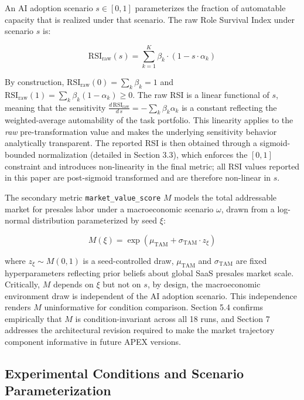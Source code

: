 \documentclass[10pt, conference]{IEEEtran}
\begin{document}
An AI adoption scenario $s \in [0,1]$ parameterizes the fraction of automatable capacity that is realized under that scenario. The raw Role Survival Index under scenario $s$ is:

\begin{equation}
\text{RSI}_{\text{raw}}(s) = \sum_{k=1}^{K} \beta_k \cdot \left(1 - s \cdot \alpha_k\right)
\end{equation}

By construction, $\text{RSI}_{\text{raw}}(0) = \sum_k \beta_k = 1$ and $\text{RSI}_{\text{raw}}(1) = \sum_k \beta_k (1 - \alpha_k) \geq 0$. The raw RSI is a linear functional of $s$, meaning that the sensitivity $\frac{d\,\text{RSI}_{\text{raw}}}{d\,s} = -\sum_k \beta_k \alpha_k$ is a constant reflecting the weighted-average automability of the task portfolio. This linearity applies to the \textit{raw} pre-transformation value and makes the underlying sensitivity behavior analytically transparent. The reported RSI is then obtained through a sigmoid-bounded normalization (detailed in Section 3.3), which enforces the $[0,1]$ constraint and introduces non-linearity in the final metric; all RSI values reported in this paper are post-sigmoid transformed and are therefore non-linear in $s$.

The secondary metric \texttt{market\_value\_score} $M$ models the total addressable market for presales labor under a macroeconomic scenario $\omega$, drawn from a log-normal distribution parameterized by seed $\xi$:

\begin{equation}
M(\xi) = \exp\left(\mu_{\text{TAM}} + \sigma_{\text{TAM}} \cdot z_\xi\right)
\end{equation}

where $z_\xi \sim M(0,1)$ is a seed-controlled draw, $\mu_{\text{TAM}}$ and $\sigma_{\text{TAM}}$ are fixed hyperparameters reflecting prior beliefs about global SaaS presales market scale. Critically, $M$ depends on $\xi$ but not on $s$, by design, the macroeconomic environment draw is independent of the AI adoption scenario. This independence renders $M$ uninformative for condition comparison. Section 5.4 confirms empirically that $M$ is condition-invariant across all 18 runs, and Section 7 addresses the architectural revision required to make the market trajectory component informative in future APEX versions.

\subsection{Experimental Conditions and Scenario Parameterization}
\end{document}
